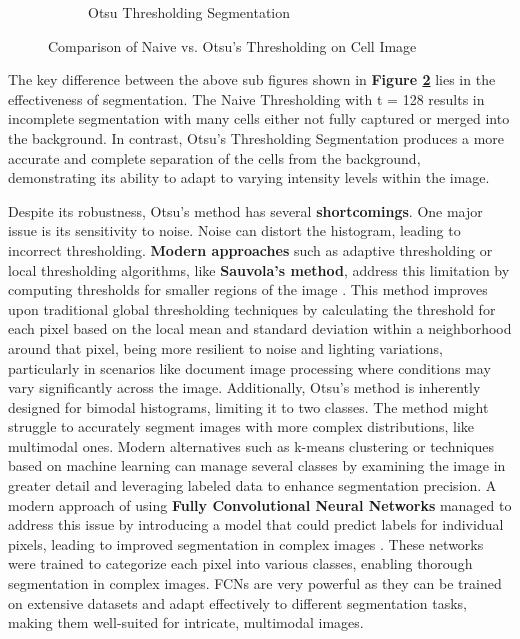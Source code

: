 \documentclass[%
	a4paper, %
	12pt, %
	english, %
	bibtotoc %
]{scrartcl}
\begin{document}
\begin{figure}[H]
\begin{subfigure}[b]{0.4\textwidth}
        \caption{Otsu Thresholding Segmentation}
        \label{fig:otsu_based_segmented_image}
    \end{subfigure}
    \caption{Comparison of Naive vs. Otsu's Thresholding on Cell Image}
    \label{fig:comparison_between_naive_and_threshold}
\end{figure}

The key difference between the above sub figures shown in \textbf{Figure \ref{fig:comparison_between_naive_and_threshold}} lies in the effectiveness of segmentation. The Naive Thresholding with t = 128 results in incomplete segmentation with many cells either not fully captured or merged into the background. In contrast, Otsu's Thresholding Segmentation produces a more accurate and complete separation of the cells from the background, demonstrating its ability to adapt to varying intensity levels within the image.
 
Despite its robustness, Otsu's method has several \textbf{shortcomings}. One major issue is its sensitivity to noise. Noise can distort the histogram, leading to incorrect thresholding. \textbf{Modern approaches} such as adaptive thresholding or local thresholding algorithms, like \textbf{Sauvola’s method}, address this limitation by computing thresholds for smaller regions of the image \cite{sauvola_adaptive_binarization}. This method improves upon traditional global thresholding techniques by calculating the threshold for each pixel based on the local mean and standard deviation within a neighborhood around that pixel, being more resilient to noise and lighting variations, particularly in scenarios like document image processing where conditions may vary significantly across the image. Additionally, Otsu's method is inherently designed for bimodal histograms, limiting it to two classes. The method might struggle to accurately segment images with more complex distributions, like multimodal ones. Modern alternatives such as k-means clustering or techniques based on machine learning can manage several classes by examining the image in greater detail and leveraging labeled data to enhance segmentation precision. A modern approach of using \textbf{Fully Convolutional Neural Networks} managed to address this issue by introducing a model that could predict labels for individual pixels, leading to improved segmentation in complex images \cite{long_fcn_segmentation}. These networks were trained to categorize each pixel into various classes, enabling thorough segmentation in complex images. FCNs are very powerful as they can be trained on extensive datasets and adapt effectively to different segmentation tasks, making them well-suited for intricate, multimodal images.
\end{document}
